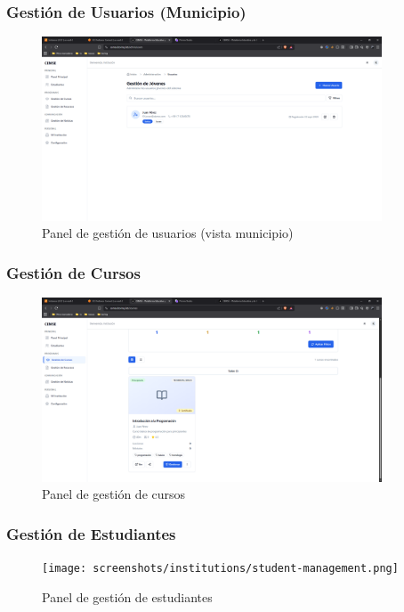 \documentclass[12pt,a4paper]{article}
\begin{document}
\begin{enumerate}
\subsubsection{Gestión de Usuarios (Municipio)}
\begin{figure}[H]
    \centering
    \includegraphics[width=0.9\textwidth]{screenshots/institutions/user-management.png}
    \caption{Panel de gestión de usuarios (vista municipio)}
    \label{fig:institution-users}
\end{figure}

\subsubsection{Gestión de Cursos}
\begin{figure}[H]
    \centering
    \includegraphics[width=0.9\textwidth]{screenshots/institutions/course-management.png}
    \caption{Panel de gestión de cursos}
    \label{fig:institution-courses}
\end{figure}

\subsubsection{Gestión de Estudiantes}
\begin{figure}[H]
    \centering
    \texttt{[image: screenshots/institutions/student-management.png]}
    \caption{Panel de gestión de estudiantes}
    \label{fig:institution-students}
\end{figure}


\end{enumerate}
\end{document}
